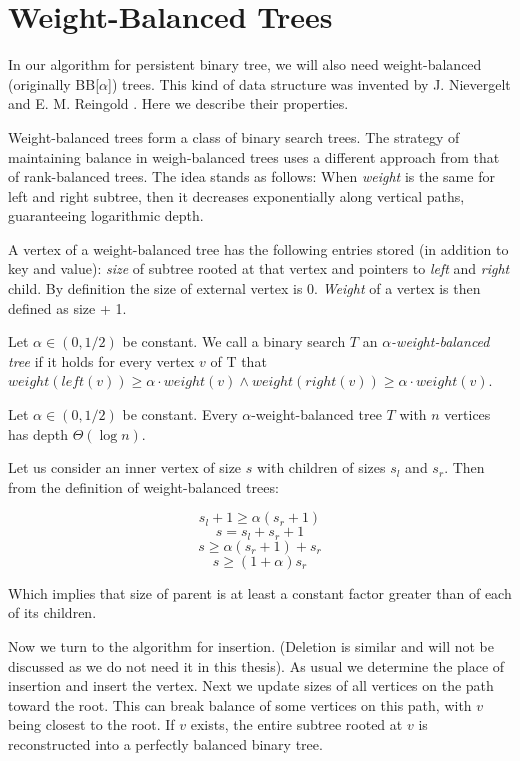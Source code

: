 \section{Weight-Balanced Trees}

In our algorithm for persistent binary tree, we will also need weight-balanced (originally BB[$\alpha$]) trees. This kind of data structure was invented by J. Nievergelt and E. M. Reingold \cite{weight-balanced}. Here we describe their properties.

Weight-balanced trees form a class of binary search trees. The strategy of maintaining balance in weigh-balanced trees uses a different approach from that of rank-balanced trees. The idea stands as follows: When \emph{weight} is the same for left and right subtree, then it decreases exponentially along vertical paths, guaranteeing logarithmic depth.

A vertex of a weight-balanced tree has the following entries stored (in addition to key and value): {\em size} of subtree rooted at that vertex and pointers to {\em left} and {\em right} child. By definition the size of external vertex is 0. {\em Weight} of a vertex is then defined as size + 1.

\begin{defn}
Let $\alpha \in (0,1/2)$ be constant. We call a binary search $T$ an {\em $\alpha$-weight-balanced tree} if it holds for every vertex $v$ of T that $weight(left(v)) \geq \alpha \cdot weight(v) \wedge weight(right(v)) \geq \alpha \cdot weight(v) $.
\end{defn}

\begin{prop}
Let $\alpha \in (0,1/2)$ be constant. Every $\alpha$-weight-balanced tree $T$ with $n$ vertices has depth $\Theta(\log n)$. 
\end{prop}

\begin{myproof}
Let us consider an inner vertex of size $s$ with children of sizes $s_l$ and $s_r$. Then from the definition of weight-balanced trees:

$$s_l + 1 \geq \alpha (s_r+1)$$
$$ s = s_l + s_r + 1 $$
$$ s \geq \alpha (s_r+1) + s_r $$
$$ s \geq (1+\alpha)s_r $$

Which implies that size of parent is at least a constant factor greater than of each of its children.
\end{myproof}

Now we turn to the algorithm for insertion. (Deletion is similar and will not be discussed as we do not need it in this thesis). As usual we determine the place of insertion and insert the vertex. Next we update sizes of all vertices on the path toward the root. This can break balance of some vertices on this path, with $v$ being closest to the root. If $v$ exists, the entire subtree rooted at $v$ is reconstructed into a perfectly balanced binary tree.

